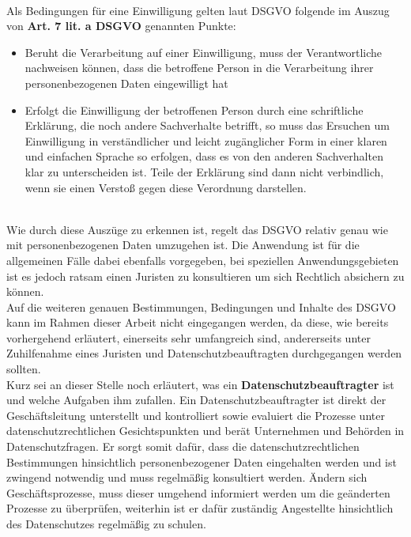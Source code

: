 \documentclass[a4paper, 12pt]{article}
\begin{document}
\cite{noauthor_datenschutz-grundverordnung_nodate}\\
Als Bedingungen für eine Einwilligung gelten laut DSGVO folgende im Auszug von \textbf{Art. 7 lit. a DSGVO} genannten Punkte:
\begin{itemize}
	\item Beruht die Verarbeitung auf einer Einwilligung, muss der Verantwortliche nachweisen können, dass die betroffene Person in die Verarbeitung ihrer personenbezogenen Daten eingewilligt hat
	\item Erfolgt die Einwilligung der betroffenen Person durch eine schriftliche Erklärung, die noch andere Sachverhalte betrifft, so muss das Ersuchen um Einwilligung in verständlicher und leicht zugänglicher Form in einer klaren und einfachen Sprache so erfolgen, dass es von den anderen Sachverhalten klar zu unterscheiden ist. Teile der Erklärung sind dann nicht verbindlich, wenn sie einen Verstoß gegen diese Verordnung darstellen.
\end{itemize}
\cite{noauthor_datenschutz-grundverordnung_nodate}\\
Wie durch diese Auszüge zu erkennen ist, regelt das DSGVO relativ genau wie mit personenbezogenen Daten umzugehen ist. Die Anwendung ist für die allgemeinen Fälle dabei ebenfalls vorgegeben, bei speziellen Anwendungsgebieten ist es jedoch ratsam einen Juristen zu konsultieren um sich Rechtlich absichern zu können.\\
Auf die weiteren genauen Bestimmungen, Bedingungen und Inhalte des DSGVO kann im Rahmen dieser Arbeit nicht eingegangen werden, da diese, wie bereits vorhergehend erläutert, einerseits sehr umfangreich sind, andererseits unter Zuhilfenahme eines Juristen und Datenschutzbeauftragten durchgegangen werden sollten.\cite{datenschutz_dsgvo,noauthor_datenschutz-grundverordnung_nodate}\\

\noindent Kurz sei an dieser Stelle noch erläutert, was ein \textbf{Datenschutzbeauftragter} ist und welche Aufgaben ihm zufallen. Ein Datenschutzbeauftragter ist direkt der Geschäftsleitung unterstellt und kontrolliert sowie evaluiert die Prozesse unter datenschutzrechtlichen Gesichtspunkten und berät Unternehmen und Behörden in Datenschutzfragen. Er sorgt somit dafür, dass die datenschutzrechtlichen Bestimmungen hinsichtlich personenbezogener Daten eingehalten werden und ist zwingend notwendig und muss regelmäßig konsultiert werden. Ändern sich Geschäftsprozesse, muss dieser umgehend informiert werden um die geänderten Prozesse zu überprüfen, weiterhin ist er dafür zuständig Angestellte hinsichtlich des Datenschutzes regelmäßig zu schulen.\cite{datenschutz_beauftragter}
\end{document}

